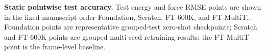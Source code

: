 \caption{\textbf{Static pointwise test accuracy.} Test energy and force RMSE points are shown in the fixed manuscript order Foundation, Scratch, FT-600K, and FT-MultiT,. Foundation points are representative grouped-test zero-shot checkpoints; Scratch and FT-600K points are grouped multi-seed retraining results; the FT-MultiT point is the frame-level baseline.}
\label{fig:task_conditioned_panel_b}
